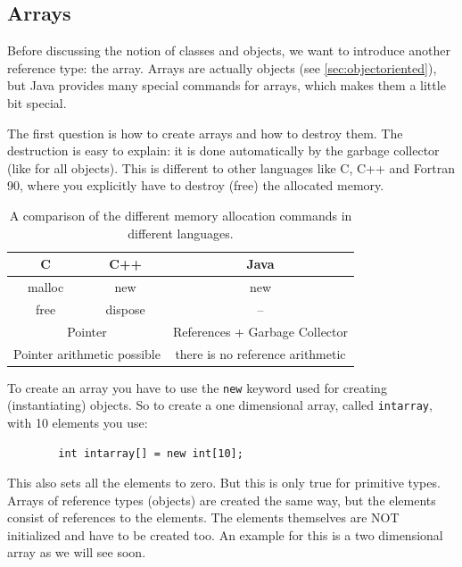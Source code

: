 
\subsection{Arrays}
\label{sec:Arrays}

Before discussing the notion of classes and objects, we want to introduce
another reference type: the array. Arrays are actually objects
(see \ref{sec:objectoriented}), but
Java provides many special commands for arrays, which makes them a 
little bit special.

The first question is how to create arrays and how to destroy them.
The destruction is easy to explain: it is done automatically
by the garbage collector (like for all objects). This is different to
other languages like C, C++ and Fortran 90, where you explicitly
have to destroy (free) the allocated memory. 
\begin{table}[htbp]
  \begin{center}
    \begin{tabular}{c|c|c}
      C & C++ & Java \\\hline
      malloc & new & new \\
      free & dispose & -- \\
      \multicolumn{2}{c}{Pointer} & References + Garbage Collector \\
      \multicolumn{2}{c}{Pointer arithmetic possible}& there is no 
                                                    reference arithmetic \\
    \end{tabular}
    \caption{A comparison of the different memory allocation commands in different languages.}
    \label{tab:MemoryAllocation}
  \end{center}
\end{table}
To create an array you have to use the \verb|new| keyword used for
creating (instantiating) objects. So to create a one dimensional
array, called \verb|intarray|, with 10 elements you use:
\begin{verbatim}
        int intarray[] = new int[10];
\end{verbatim}
This also sets all the elements to zero. But this is only true for 
primitive types. Arrays of reference types (objects) are created the
same way, but the elements consist of references to the elements. The
elements themselves are NOT initialized and have to be created too.
An example for this is a two dimensional array as we will see soon.

